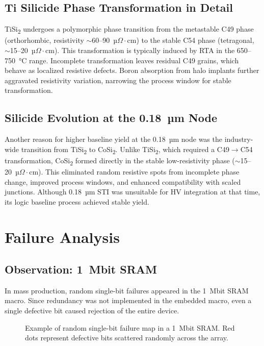 \documentclass[conference]{IEEEtran}
\begin{document}
\subsection{Ti Silicide Phase Transformation in Detail}
TiSi\textsubscript{2} undergoes a polymorphic phase transition from
the metastable C49 phase (orthorhombic, resistivity $\sim$60--90~µ$\Omega\cdot$cm)
to the stable C54 phase (tetragonal, $\sim$15--20~µ$\Omega\cdot$cm).
This transformation is typically induced by RTA in the 650--750~°C range.
Incomplete transformation leaves residual C49 grains, which behave as
localized resistive defects.
Boron absorption from halo implants further aggravated resistivity variation,
narrowing the process window for stable transformation.

\subsection{Silicide Evolution at the 0.18~µm Node}
Another reason for higher baseline yield at the 0.18~µm node was the
industry-wide transition from TiSi\textsubscript{2} to CoSi\textsubscript{2}.
Unlike TiSi\textsubscript{2}, which required a C49$\rightarrow$C54 transformation,
CoSi\textsubscript{2} formed directly in the stable low-resistivity phase
($\sim$15--20~µ$\Omega\cdot$cm). This eliminated random resistive spots
from incomplete phase change, improved process windows, and enhanced
compatibility with scaled junctions. Although 0.18~µm STI was unsuitable
for HV integration at that time, its logic baseline process achieved
stable yield.

\section{Failure Analysis}
\subsection{Observation: 1~Mbit SRAM}
In mass production, random single-bit failures appeared in the 1~Mbit SRAM macro. Since redundancy was not implemented in the embedded macro, even a single defective bit caused rejection of the entire device.

\begin{figure}[!t]
  \centering
  \caption{Example of random single-bit failure map in a 1~Mbit SRAM. Red dots represent defective bits scattered randomly across the array.}
  \label{fig:failmap}
\end{figure}
\end{document}

